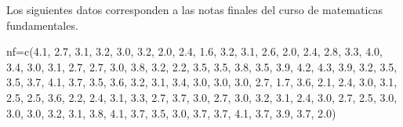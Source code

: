 \documentclass[
]{article}
\newenvironment{Shaded}{\begin{snugshade}}{\end{snugshade}}
\newcommand{\FloatTok}[1]{\textcolor[rgb]{0.00,0.00,0.81}{#1}}
\newcommand{\FunctionTok}[1]{\textcolor[rgb]{0.00,0.00,0.00}{#1}}
\newcommand{\NormalTok}[1]{#1}
\newcommand{\OtherTok}[1]{\textcolor[rgb]{0.56,0.35,0.01}{#1}}
\begin{document}
Los siguientes datos corresponden a las notas finales del curso de
matematicas fundamentales.

\begin{Shaded}
\begin{Highlighting}[]
\NormalTok{nf}\OtherTok{=}\FunctionTok{c}\NormalTok{(}\FloatTok{4.1}\NormalTok{, }\FloatTok{2.7}\NormalTok{, }\FloatTok{3.1}\NormalTok{, }\FloatTok{3.2}\NormalTok{, }\FloatTok{3.0}\NormalTok{, }\FloatTok{3.2}\NormalTok{, }\FloatTok{2.0}\NormalTok{, }\FloatTok{2.4}\NormalTok{, }\FloatTok{1.6}\NormalTok{, }\FloatTok{3.2}\NormalTok{, }\FloatTok{3.1}\NormalTok{, }\FloatTok{2.6}\NormalTok{, }\FloatTok{2.0}\NormalTok{, }\FloatTok{2.4}\NormalTok{, }\FloatTok{2.8}\NormalTok{, }
     \FloatTok{3.3}\NormalTok{, }\FloatTok{4.0}\NormalTok{, }\FloatTok{3.4}\NormalTok{, }\FloatTok{3.0}\NormalTok{, }\FloatTok{3.1}\NormalTok{, }\FloatTok{2.7}\NormalTok{, }\FloatTok{2.7}\NormalTok{, }\FloatTok{3.0}\NormalTok{, }\FloatTok{3.8}\NormalTok{, }\FloatTok{3.2}\NormalTok{, }\FloatTok{2.2}\NormalTok{, }\FloatTok{3.5}\NormalTok{, }\FloatTok{3.5}\NormalTok{, }\FloatTok{3.8}\NormalTok{, }\FloatTok{3.5}\NormalTok{, }
     \FloatTok{3.9}\NormalTok{, }\FloatTok{4.2}\NormalTok{, }\FloatTok{4.3}\NormalTok{, }\FloatTok{3.9}\NormalTok{, }\FloatTok{3.2}\NormalTok{, }\FloatTok{3.5}\NormalTok{, }\FloatTok{3.5}\NormalTok{, }\FloatTok{3.7}\NormalTok{, }\FloatTok{4.1}\NormalTok{, }\FloatTok{3.7}\NormalTok{, }\FloatTok{3.5}\NormalTok{, }\FloatTok{3.6}\NormalTok{, }\FloatTok{3.2}\NormalTok{, }\FloatTok{3.1}\NormalTok{, }\FloatTok{3.4}\NormalTok{, }
     \FloatTok{3.0}\NormalTok{, }\FloatTok{3.0}\NormalTok{, }\FloatTok{3.0}\NormalTok{, }\FloatTok{2.7}\NormalTok{, }\FloatTok{1.7}\NormalTok{, }\FloatTok{3.6}\NormalTok{, }\FloatTok{2.1}\NormalTok{, }\FloatTok{2.4}\NormalTok{, }\FloatTok{3.0}\NormalTok{, }\FloatTok{3.1}\NormalTok{, }\FloatTok{2.5}\NormalTok{, }\FloatTok{2.5}\NormalTok{, }\FloatTok{3.6}\NormalTok{, }\FloatTok{2.2}\NormalTok{, }\FloatTok{2.4}\NormalTok{, }
     \FloatTok{3.1}\NormalTok{, }\FloatTok{3.3}\NormalTok{, }\FloatTok{2.7}\NormalTok{, }\FloatTok{3.7}\NormalTok{, }\FloatTok{3.0}\NormalTok{, }\FloatTok{2.7}\NormalTok{, }\FloatTok{3.0}\NormalTok{, }\FloatTok{3.2}\NormalTok{, }\FloatTok{3.1}\NormalTok{, }\FloatTok{2.4}\NormalTok{, }\FloatTok{3.0}\NormalTok{, }\FloatTok{2.7}\NormalTok{, }\FloatTok{2.5}\NormalTok{, }\FloatTok{3.0}\NormalTok{, }\FloatTok{3.0}\NormalTok{, }
     \FloatTok{3.0}\NormalTok{, }\FloatTok{3.2}\NormalTok{, }\FloatTok{3.1}\NormalTok{, }\FloatTok{3.8}\NormalTok{, }\FloatTok{4.1}\NormalTok{, }\FloatTok{3.7}\NormalTok{, }\FloatTok{3.5}\NormalTok{, }\FloatTok{3.0}\NormalTok{, }\FloatTok{3.7}\NormalTok{, }\FloatTok{3.7}\NormalTok{, }\FloatTok{4.1}\NormalTok{, }\FloatTok{3.7}\NormalTok{, }\FloatTok{3.9}\NormalTok{, }\FloatTok{3.7}\NormalTok{, }\FloatTok{2.0}\NormalTok{)}
\end{Highlighting}
\end{Shaded}
\end{document}
